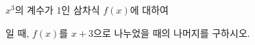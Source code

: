 $x^3$의 계수가 $1$인 삼차식 $f(x)$에 대하여 \par\smallskip{}\par\smallskip\noindent 일 때, $f(x)$를 $x+3$으로 나누었을 때의 나머지를 구하시오.
